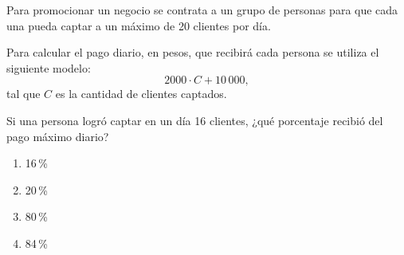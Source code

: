 \begin{problem}
    Para promocionar un negocio se contrata a un grupo de personas para que cada una pueda captar a un máximo de 20 clientes por día.

    Para calcular el pago diario, en pesos, que recibirá cada persona se utiliza el siguiente modelo:
    \[
    2000 \cdot C + 10\,000,
    \]
    tal que $C$ es la cantidad de clientes captados.

    Si una persona logró captar en un día 16 clientes, ¿qué porcentaje recibió del pago máximo diario?

    \begin{enumerate}[label=\Alph*.]
        \item 16\,\%
        \item 20\,\%
        \item 80\,\%
        \item 84\,\%
    \end{enumerate}
\end{problem}
